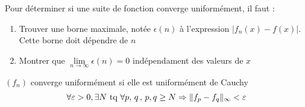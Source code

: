 \begin{note}
Pour déterminer si une suite de fonction converge uniformément, il faut :
\begin{enumerate}
	\item Trouver une borne maximale, notée $\epsilon(n)$ à l'expression $|f_n(x)-f(x)|$. Cette borne doit dépendre de $n$
    \item Montrer que $\lim\limits_{n\to\infty}\epsilon(n) = 0$ indépendament des valeurs de $x$
\end{enumerate}
\end{note}

\begin{prop}
$(f_n)$ converge uniformément si elle est uniformément de Cauchy
$$\forall\varepsilon>0,\exists N \text{~tq~} \forall p,\,q\,,\,p,q\geq N \Rightarrow \|f_p-f_q\|_\infty < \varepsilon$$
\end{prop}

